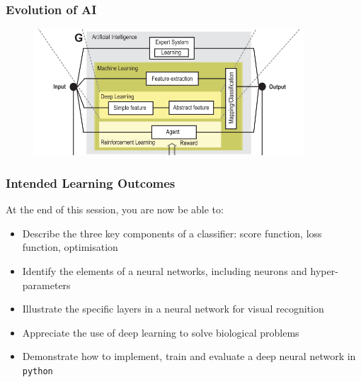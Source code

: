 \documentclass{beamer}
\begin{document}
\begin{frame}
        \frametitle{Evolution of AI}

        \begin{figure}
                \includegraphics[width=0.9\textwidth]{Pics/evoAI.png}
        \end{figure}

\end{frame}













\begin{frame}
        \frametitle{Intended Learning Outcomes}

        At the end of this session, you are now be able to:
        \begin{itemize}
                \item Describe the three key components of a classifier: score function, loss function, optimisation
                \item Identify the elements of a neural networks, including neurons and hyper-parameters
                \item Illustrate the specific layers in a neural network for visual recognition
                \item Appreciate the use of deep learning to solve biological problems
                \item Demonstrate how to implement, train and evaluate a deep neural network in \texttt{python}
        \end{itemize}

\end{frame}


\end{document}

